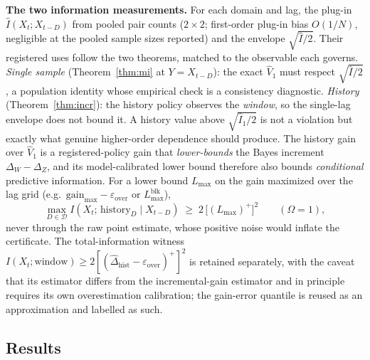 \documentclass[11pt]{article}
\begin{document}
\textbf{The two information measurements.} For each domain and lag, the
plug-in $\widehat I(X_t;X_{t-D})$ from pooled pair counts ($2{\times}2$;
first-order plug-in bias $O(1/N)$, negligible at the pooled sample sizes
reported) and the envelope $\sqrt{\widehat I/2}$. Their registered uses
follow the two theorems, matched to the observable each governs.
\emph{Single sample} (Theorem~\ref{thm:mi} at $Y=X_{t-D}$): the exact
$\widehat V_1$ must respect $\sqrt{\widehat I/2}$, a population identity
whose empirical check is a consistency diagnostic. \emph{History}
(Theorem~\ref{thm:incr}): the history policy observes the \emph{window},
so the single-lag envelope does not bound it. A history value above
$\sqrt{\widehat I_1/2}$ is not a violation but exactly what genuine
higher-order dependence should produce. The history gain over
$\widehat V_1$ is a registered-policy gain that \emph{lower-bounds} the
Bayes increment $\Delta_W-\Delta_Z$, and its model-calibrated lower
bound therefore also bounds \emph{conditional} predictive information.
For a lower bound $L_{\max}$ on the gain maximized over the lag grid
(e.g.\ $\text{gain}_{\max}-\varepsilon_{\mathrm{over}}$ or $L^{\mathrm{blk}}_{\max}$),
\[
\max_{D\in\mathcal D}I(X_t;\,\text{history}_D\mid X_{t-D})\;\ge\;
2\,\bigl[(L_{\max})^{+}\bigr]^{2}\qquad(\Omega=1),
\]
never through the raw point estimate, whose positive noise would inflate
the certificate. The total-information witness
$I(X_t;\text{window})\ge2[(\widehat\Delta_{\mathrm{hist}}
-\varepsilon_{\mathrm{over}})^{+}]^{2}$ is retained separately, with the
caveat that its estimator differs from the incremental-gain estimator and
in principle requires its own overestimation calibration; the gain-error
quantile is reused as an approximation and labelled as such.

\subsection{Results}
\end{document}
